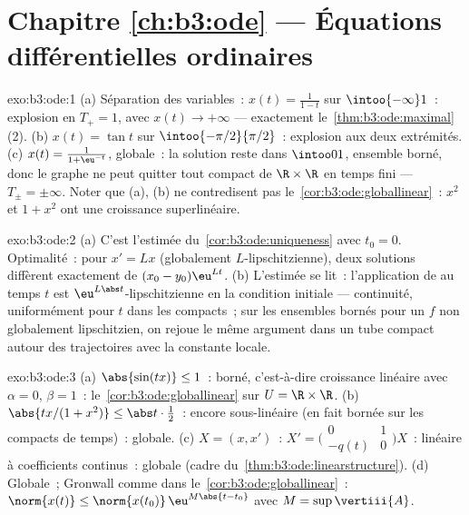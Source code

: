 \section*{Chapitre \ref{ch:b3:ode} --- Équations différentielles
ordinaires}

\begin{solution}{exo:b3:ode:1}
(a) Séparation des variables~: $x(t) = \frac1{1 - t}$ sur
$\intoo{-\infty}1$~: explosion en $T_+ = 1$, avec $x(t) \to
+\infty$ --- exactement le~\cref{thm:b3:ode:maximal}(2).
(b) $x(t) = \tan t$ sur $\intoo{-\pi/2}{\pi/2}$~: explosion
aux deux extrémités.
(c) $x(t) = \frac{1}{1 + \eu^{-t}}$, globale~: la solution
reste dans $\intoo01$, ensemble borné, donc le graphe ne
peut quitter tout compact de $\R\times\R$ en temps fini ---
$T_\pm = \pm\infty$. Noter que (a), (b) ne contredisent pas
le~\cref{cor:b3:ode:globallinear}~: $x^2$ et $1 + x^2$ ont
une croissance superlinéaire.
\end{solution}

\begin{solution}{exo:b3:ode:2}
(a) C'est l'estimée du~\cref{cor:b3:ode:uniqueness} avec
$t_0 = 0$. Optimalité~: pour $x' = Lx$ (globalement
$L$-lipschitzienne), deux solutions diffèrent exactement de
$(x_0 - y_0)\eu^{Lt}$.
(b) L'estimée se lit~: l'application de  au temps $t$
est $\eu^{L\abs t}$-lipschitzienne en la condition initiale
--- continuité, uniformément pour $t$ dans les compacts~; sur
les ensembles bornés pour un $f$ non globalement
lipschitzien, on rejoue le même argument dans un tube compact
autour des trajectoires avec la constante locale.
\end{solution}

\begin{solution}{exo:b3:ode:3}
(a) $\abs{\sin(tx)} \leq 1$~: borné, c'est-à-dire croissance
linéaire avec $\alpha = 0$, $\beta = 1$~:
le~\cref{cor:b3:ode:globallinear} sur $U = \R\times\R$.
(b) $\abs{tx/(1 + x^2)} \leq \abs t\cdot\frac12$~: encore
sous-linéaire (en fait bornée sur les compacts de temps)~:
globale.
(c) $X = (x, x')$~: $X' = \bigl(\begin{smallmatrix}0 & 1\\ -q(t)
& 0\end{smallmatrix}\bigr)X$~: linéaire à coefficients
continus~: globale (cadre du~\cref{thm:b3:ode:linearstructure}).
(d) Globale~; Gronwall comme dans
le~\cref{cor:b3:ode:globallinear}~: $\norm{x(t)} \leq
\norm{x(t_0)}\,\eu^{M\abs{t - t_0}}$ avec $M =
\sup\vertiii{A}$.
\end{solution}

